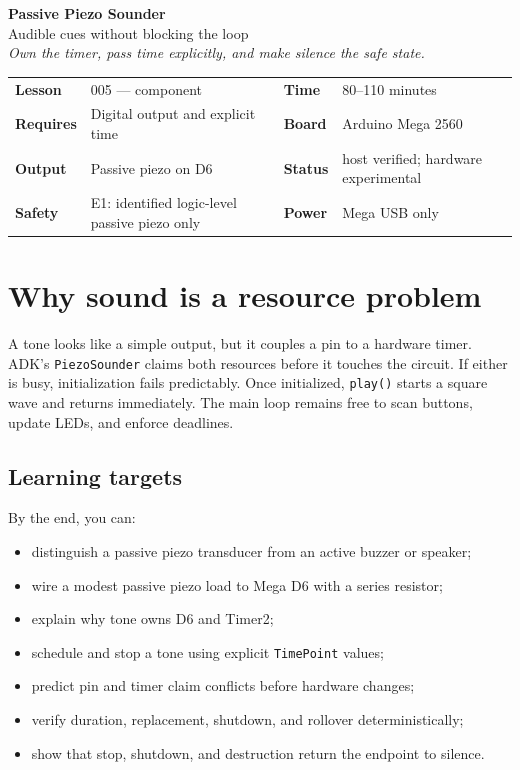 \documentclass[11pt]{article}
\begin{document}
\begin{center}
    {\Huge\bfseries Passive Piezo Sounder}\\[4pt]
    {\Large Audible cues without blocking the loop}\\[8pt]
    \textit{Own the timer, pass time explicitly, and make silence the safe state.}
\end{center}

\begin{tabularx}{\linewidth}{@{}>{\bfseries}l X >{\bfseries}l X@{}}
Lesson & 005 --- component & Time & 80--110 minutes\\
Requires & Digital output and explicit time & Board & Arduino Mega 2560\\
Output & Passive piezo on D6 & Status & host verified; hardware experimental\\
Safety & E1: identified logic-level passive piezo only & Power & Mega USB only\\
\end{tabularx}

\section{Why sound is a resource problem}

A tone looks like a simple output, but it couples a pin to a hardware timer.
ADK's \texttt{PiezoSounder} claims both resources before it touches the circuit.
If either is busy, initialization fails predictably. Once initialized,
\texttt{play()} starts a square wave and returns immediately. The main loop remains
free to scan buttons, update LEDs, and enforce deadlines.

\subsection*{Learning targets}

By the end, you can:

\begin{itemize}
    \item distinguish a passive piezo transducer from an active buzzer or speaker;
    \item wire a modest passive piezo load to Mega D6 with a series resistor;
    \item explain why tone owns D6 and Timer2;
    \item schedule and stop a tone using explicit \texttt{TimePoint} values;
    \item predict pin and timer claim conflicts before hardware changes;
    \item verify duration, replacement, shutdown, and rollover deterministically;
    \item show that stop, shutdown, and destruction return the endpoint to silence.
\end{itemize}
\end{document}
